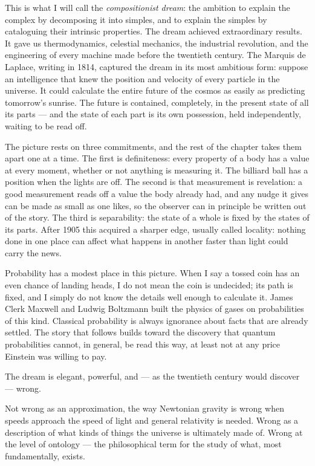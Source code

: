 This is what I will call the \emph{compositionist dream}: the ambition to explain the complex by decomposing it into simples, and to explain the simples by cataloguing their intrinsic properties. The dream achieved extraordinary results. It gave us thermodynamics, celestial mechanics, the industrial revolution, and the engineering of every machine made before the twentieth century. The Marquis de Laplace, writing in 1814, captured the dream in its most ambitious form: suppose an intelligence that knew the position and velocity of every particle in the universe. It could calculate the entire future of the cosmos as easily as predicting tomorrow's sunrise. The future is contained, completely, in the present state of all its parts --- and the state of each part is its own possession, held independently, waiting to be read off.

The picture rests on three commitments, and the rest of the chapter takes them apart one at a time. The first is definiteness: every property of a body has a value at every moment, whether or not anything is measuring it. The billiard ball has a position when the lights are off. The second is that measurement is revelation: a good measurement reads off a value the body already had, and any nudge it gives can be made as small as one likes, so the observer can in principle be written out of the story. The third is separability: the state of a whole is fixed by the states of its parts. After 1905 this acquired a sharper edge, usually called locality: nothing done in one place can affect what happens in another faster than light could carry the news.

Probability has a modest place in this picture. When I say a tossed coin has an even chance of landing heads, I do not mean the coin is undecided; its path is fixed, and I simply do not know the details well enough to calculate it. James Clerk Maxwell and Ludwig Boltzmann built the physics of gases on probabilities of this kind. Classical probability is always ignorance about facts that are already settled. The story that follows builds toward the discovery that quantum probabilities cannot, in general, be read this way, at least not at any price Einstein was willing to pay.

The dream is elegant, powerful, and --- as the twentieth century would discover --- wrong.

Not wrong as an approximation, the way Newtonian gravity is wrong when speeds approach the speed of light and general relativity is needed. Wrong as a description of what kinds of things the universe is ultimately made of. Wrong at the level of ontology --- the philosophical term for the study of what, most fundamentally, exists.

